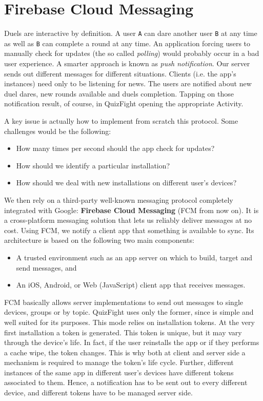 \section{Firebase Cloud Messaging}
Duels are interactive by definition. A user \texttt{A} can dare another user \texttt{B} at any time as well as \texttt{B} can complete a round at any time. An application forcing users to manually check for updates (the so called \textit{polling}) would probably occur in a bad user experience. A smarter approach is known as \textit{push notification}. Our server sends out different messages for different situations. Clients (i.e. the app's instances) need only to be listening for news. The users are notified about new duel dares, new rounds available and duels completion. Tapping on those notification result, of course, in QuizFight opening the appropriate Activity. 

A key issue is actually how to implement from scratch this protocol. Some challenges would be the following:
\begin{itemize}
	\item How many times per second should the app check for updates?
	\item How should we identify a particular installation?
	\item How should we deal with new installations on different user's devices?
\end{itemize}

We then rely on a third-party well-known messaging protocol completely integrated with Google: \textbf{Firebase Cloud Messaging} (FCM from now on). It is a cross-platform messaging solution that lets us reliably deliver messages at no cost. Using FCM, we notify a client app that something is available to sync. Its architecture is based on the following two main components:
\begin{itemize}
	\item A trusted environment such as an app server on which to build, target and send messages, and
	\item An iOS, Android, or Web (JavaScript) client app that receives messages.
\end{itemize}
FCM basically allows server implementations to send out messages to single devices, groups or by topic. QuizFight uses only the former, since is simple and well suited for its purposes. This mode relies on installation tokens. At the very first installation a token is generated. This token is unique, but it may vary through the device's life. In fact, if the user reinstalls the app or if they performs a cache wipe, the token changes. This is why both at client and server side a mechanism is required to manage the token's life cycle. Further, different instances of the same app in different user's devices have different tokens associated to them. Hence, a notification has to be sent out to every different device, and different tokens have to be managed server side.

